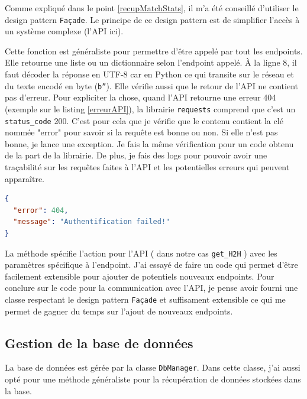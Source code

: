 \documentclass[a4paper,14pt]{extarticle}
\begin{document}
{Comme expliqué dans le point \ref{recupMatchStats}, il m'a été conseillé d'utiliser le design pattern \texttt{Façade}. Le principe de ce design pattern est de simplifier l'accès à un système complexe (l'API ici).


Cette fonction est généraliste pour permettre d'être appelé par tout les endpoints. Elle retourne une liste ou un dictionnaire selon l'endpoint appelé. À la ligne 8, il faut décoder la réponse en UTF-8 car en Python ce qui transite sur le réseau et du texte encodé en byte (\texttt{b''}). 
Elle vérifie aussi que le retour de l'API ne contient pas d'erreur. Pour expliciter la chose, quand l'API retourne une erreur 404 (exemple sur le listing \ref{erreurAPI}), la librairie \texttt{requests} comprend que c'est un \texttt{status\_code} 200. C'est pour cela que je vérifie que le contenu contient la clé nommée "error" pour savoir si la requête est bonne ou non. Si elle n'est pas bonne, je lance une exception. Je fais la même vérification pour un code obtenu de la part de la librairie.
De plus, je fais des logs pour pouvoir avoir une traçabilité sur les requêtes faites à l'API et les potentielles erreurs qui peuvent apparaître.

\begin{lstlisting}[language=json, firstnumber=1, caption=Retour d'une erreur de l'API, captionpos=b, label=erreurAPI]
{
  "error": 404,
  "message": "Authentification failed!"
}
\end{lstlisting}


La méthode spécifie l'action pour l'API ( dans notre cas \texttt{get\_H2H} ) avec les paramètres spécifique à l'endpoint.
J'ai essayé de faire un code qui permet d'être facilement extensible pour ajouter de potentiels nouveaux endpoints. Pour conclure sur le code pour la communication avec l'API, je pense avoir fourni une classe respectant le design pattern \texttt{Façade} et suffisament extensible ce qui me permet de gagner du temps sur l'ajout de nouveaux endpoints.

\subsection{Gestion de la base de données}

La base de données est gérée par la classe \texttt{DbManager}. Dans cette classe, j'ai aussi opté pour une méthode généraliste pour la récupération de données stockées dans la base.

}
\end{document}
